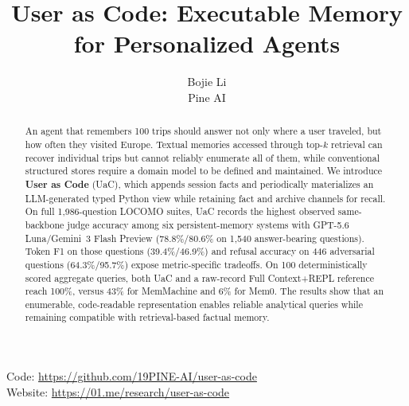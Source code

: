 \documentclass[11pt]{article}
\title{User as Code: Executable Memory for Personalized Agents}
\author{
  Bojie Li \\
  Pine AI
}
\date{}
\begin{document}
\maketitle

\begin{abstract}
An agent that remembers 100 trips should answer not only where a user traveled, but how often they visited Europe. Textual memories accessed through top-$k$ retrieval can recover individual trips but cannot reliably enumerate all of them, while conventional structured stores require a domain model to be defined and maintained. We introduce \textbf{User as Code} (UaC), which appends session facts and periodically materializes an LLM-generated typed Python view while retaining fact and archive channels for recall. On full 1{,}986-question LOCOMO suites, UaC records the highest observed same-backbone judge accuracy among six persistent-memory systems with GPT-5.6 Luna/Gemini~3 Flash Preview (78.8\%/80.6\% on 1{,}540 answer-bearing questions). Token F1 on those questions (39.4\%/46.9\%) and refusal accuracy on 446 adversarial questions (64.3\%/95.7\%) expose metric-specific tradeoffs. On 100 deterministically scored aggregate queries, both UaC and a raw-record Full Context+REPL reference reach 100\%, versus 43\% for MemMachine and 6\% for Mem0. The results show that an enumerable, code-readable representation enables reliable analytical queries while remaining compatible with retrieval-based factual memory.
\end{abstract}

\begin{center}
\small
Code: \url{https://github.com/19PINE-AI/user-as-code} \\[2pt]
Website: \url{https://01.me/research/user-as-code}
\end{center}
\vspace{-0.6em}





\end{document}
